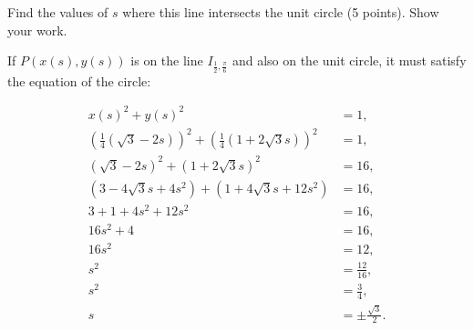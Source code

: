 \documentclass[12pt,twoside]{article}
\begin{document}
	\item Find the values of \( s \) where this line intersects the unit circle (5 points). Show your work. 

If \( P(x(s), y(s)) \) is on the line \( I_{\frac{1}{2}, \frac{\pi}{6}} \) and also on the unit circle, it must satisfy the equation of the circle:

\begin{align*}
    x(s)^2 + y(s)^2 &= 1, \\
    \left(\frac{1}{4}\left(\sqrt{3} - 2s\right)\right)^2 + \left(\frac{1}{4}\left(1 + 2\sqrt{3}s\right)\right)^2 &= 1, \\
    \left(\sqrt{3} - 2s\right)^2 + \left(1 + 2\sqrt{3}s\right)^2 &= 16, \\
    (3 - 4\sqrt{3}s + 4s^2) + (1 + 4\sqrt{3}s + 12s^2) &= 16, \\
    3 + 1 + 4s^2 + 12s^2 &= 16, \\
    16s^2 + 4 &= 16, \\
    16s^2 &= 12, \\
    s^2 &= \frac{12}{16}, \\
    s^2 &= \frac{3}{4}, \\
    s &= \pm \frac{\sqrt{3}}{2}.
\end{align*}

\ee
\end{document}
